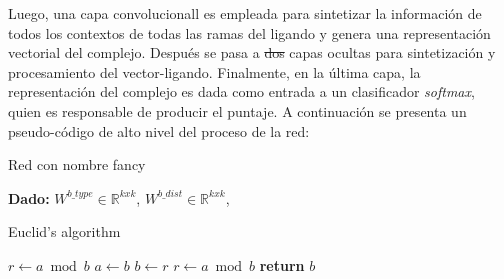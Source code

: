 Luego, una capa convolucionall es empleada para sintetizar la
información de todos los contextos de todas las ramas del ligando y
genera una representación vectorial del complejo. Después se pasa a
\sout{dos} capas ocultas para sintetización y procesamiento del
vector-ligando. Finalmente, en la última capa, la representación del
complejo es dada como entrada a un clasificador \textit{softmax},
quien es responsable de producir el puntaje. A continuación se
presenta un pseudo-código de alto nivel del proceso de la red:
\begin{algorithm}
  \caption{Red con nombre fancy}
  \begin{algorithmic}[1]
    \State \textbf{Dado:} $W^{b\_type} \in \mathbb{R}^{kxk}$,
    $W^{b\_dist} \in \mathbb{R}^{kxk}$,
    
  \end{algorithmic}
\end{algorithm}

\begin{algorithm}
\caption{Euclid’s algorithm}\label{euclid}
\begin{algorithmic}[1]
\State $r\gets a\bmod b$
\State $a\gets b$
\State $b\gets r$
\State $r\gets a\bmod b$
\EndWhile\label{euclidendwhile}
\State \textbf{return} $b$
\EndProcedure
\end{algorithmic}
\end{algorithm}
